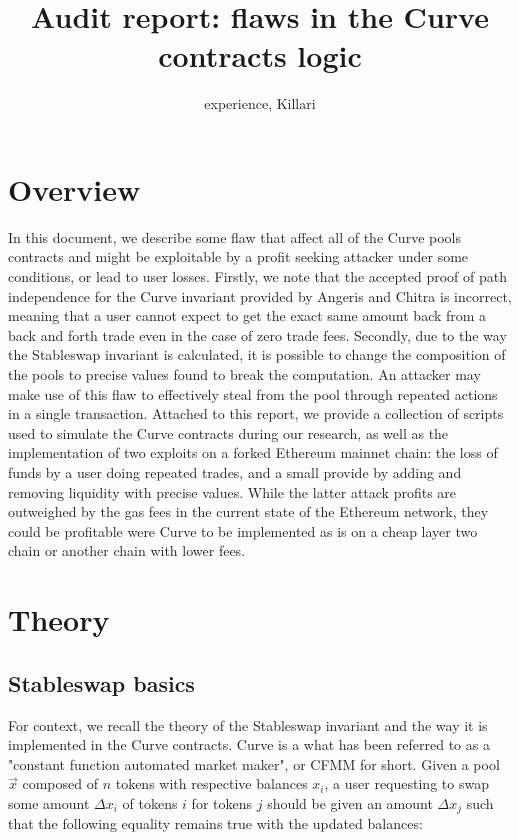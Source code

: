 \documentclass{article}
\title{Audit report: flaws in the Curve contracts logic}
\author{experience, Killari}
\begin{document}
    \maketitle

    \section{Overview}

    In this document, we describe some flaw that affect all of the Curve pools contracts and might be exploitable by a profit seeking attacker under some conditions, or lead to user losses. Firstly, we note that the accepted proof of path independence for the Curve invariant provided by Angeris and Chitra is incorrect, meaning that a user cannot expect to get the exact same amount back from a back and forth trade even in the case of zero trade fees. Secondly, due to the way the Stableswap invariant is calculated, it is possible to change the composition of the pools to precise values found to break the computation. An attacker may make use of this flaw to effectively steal from the pool through repeated actions in a single transaction. Attached to this report, we provide a collection of scripts used to simulate the Curve contracts during our research, as well as the implementation of two exploits on a forked Ethereum mainnet chain: the loss of funds by a user doing repeated trades, and a small provide by adding and removing liquidity with precise values. While the latter attack profits are outweighed by the gas fees in the current state of the Ethereum network, they could be profitable were Curve to be implemented as is on a cheap layer two chain or another chain with lower fees. 

    \section{Theory}

    \subsection{Stableswap basics}

    For context, we recall the theory of the Stableswap invariant and the way it is implemented in the Curve contracts. Curve is a what has been referred to as a "constant function automated market maker", or CFMM for short. Given a pool $\vec{x}$ composed of $n$ tokens with respective balances $x_{i}$, a user requesting to swap some amount $\Delta x_{i}$ of tokens $i$ for tokens $j$ should be given an amount $\Delta x_{j}$ such that the following equality remains true with the updated balances: 
\end{document}
